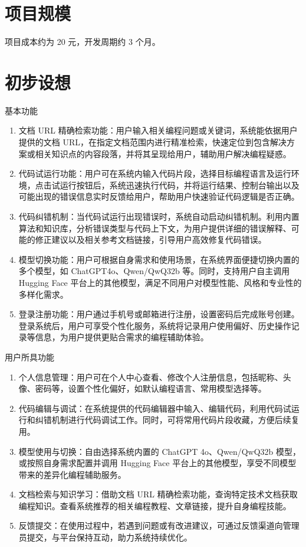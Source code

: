 \documentclass[
    report,     %
    oneside,    %
    UTF8,       %
    zihao=-4    %
]{config} %
\begin{document}
\section{项目规模}
项目成本约为 20 元，开发周期约 3 个月。

\section{初步设想}
基本功能
\begin{enumerate}[itemsep=2pt,topsep=0.6pt,parsep=0.6pt]
\item 文档 URL 精确检索功能：用户输入相关编程问题或关键词，系统能依据用户提供的文档 URL，在指定文档范围内进行精准检索，快速定位到包含解决方案或相关知识点的内容段落，并将其呈现给用户，辅助用户解决编程疑惑。
\item 代码试运行功能：用户可在系统内输入代码片段，选择目标编程语言及运行环境，点击试运行按钮后，系统迅速执行代码，并将运行结果、控制台输出以及可能出现的错误信息实时反馈给用户，帮助用户快速验证代码逻辑是否正确。
\item 代码纠错机制：当代码试运行出现错误时，系统自动启动纠错机制。利用内置算法和知识库，分析错误类型与代码上下文，为用户提供详细的错误解释、可能的修正建议以及相关参考文档链接，引导用户高效修复代码错误。
\item 模型切换功能：用户可根据自身需求和使用场景，在系统界面便捷切换内置的多个模型，如 ChatGPT4o、Qwen/QwQ32b 等。同时，支持用户自主调用 Hugging Face 平台上的其他模型，满足不同用户对模型性能、风格和专业性的多样化需求。
\item 登录注册功能：用户通过手机号或邮箱进行注册，设置密码后完成账号创建。登录系统后，用户可享受个性化服务，系统将记录用户使用偏好、历史操作记录等信息，为用户提供更贴合需求的编程辅助体验。
\end{enumerate}
用户所具功能
\begin{enumerate}[itemsep=2pt,topsep=0.6pt,parsep=0.6pt]
\item 个人信息管理：用户可在个人中心查看、修改个人注册信息，包括昵称、头像、密码等，设置个性化偏好，如默认编程语言、常用模型选择等。
\item 代码编辑与调试：在系统提供的代码编辑器中输入、编辑代码，利用代码试运行和纠错机制进行代码调试工作。同时，可将常用代码片段收藏，方便后续复用。
\item 模型使用与切换：自由选择系统内置的 ChatGPT 4o、Qwen/QwQ32b 模型，或按照自身需求配置并调用 Hugging Face 平台上的其他模型，享受不同模型带来的差异化编程辅助服务。
\item 文档检索与知识学习：借助文档 URL 精确检索功能，查询特定技术文档获取编程知识。查看系统推荐的相关编程教程、文章链接，提升自身编程技能。
\item 反馈提交：在使用过程中，若遇到问题或有改进建议，可通过反馈渠道向管理员提交，与平台保持互动，助力系统持续优化。
\end{enumerate}
\end{document}
